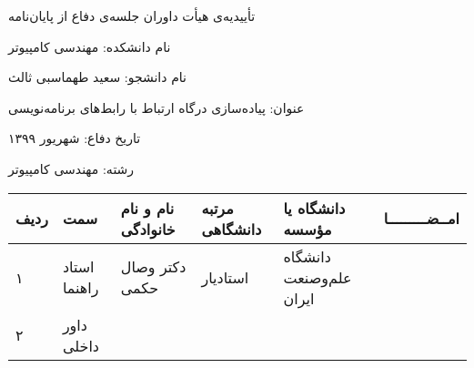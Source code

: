 \newpage
\thispagestyle{empty}

\begin{center}
{\Large
    تأییدیه‌ی هیأت داوران جلسه‌ی دفاع از پایان‌نامه
}
\end{center}
\vspace{1cm}

نام دانشكده: مهندسی کامپیوتر

نام دانشجو: سعید طهماسبی ثالث

عنوان: پیاده‌سازی درگاه ارتباط با رابط‌های برنامه‌نویسی

تاریخ دفاع: شهریور ۱۳۹۹

رشته: مهندسی کامپیوتر \\[50pt]
\begin{center}
    \begin{tabular}{| p{8mm} | p{18mm} | p{} |p{14mm}|p{}|c|}
        \hline
        ردیف & سمت & نام و نام خانوادگی & مرتبه دانشگاهی & دانشگاه یا مؤسسه & امــضـــــــــا\\
        \hline
        ۱ & استاد راهنما & دکتر \newline وصال حکمی & استادیار & دانشگاه علم‌و‌صنعت ایران &    \\
        \hline
        ۲ & داور داخلی &   &   &   &     \\
        \hline


    \end{tabular}
\end{center}


\cleardoublepage 